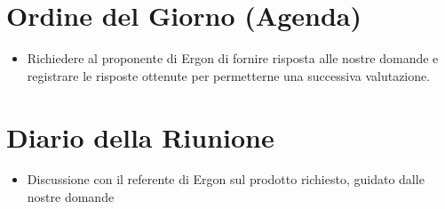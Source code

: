 \documentclass[a4paper, 11pt, oneside]{scrartcl} %
\begin{document}
\newpage
\section{Ordine del Giorno (Agenda)}
\begin{itemize}
    \item Richiedere al proponente di Ergon di fornire risposta alle nostre domande e registrare le risposte ottenute per permetterne una successiva valutazione.
\end{itemize}


\newpage
\section{Diario della Riunione}
\begin{itemize}
    \item Discussione con il referente di Ergon sul prodotto richiesto, guidato dalle nostre domande
\end{itemize}
\end{document}
